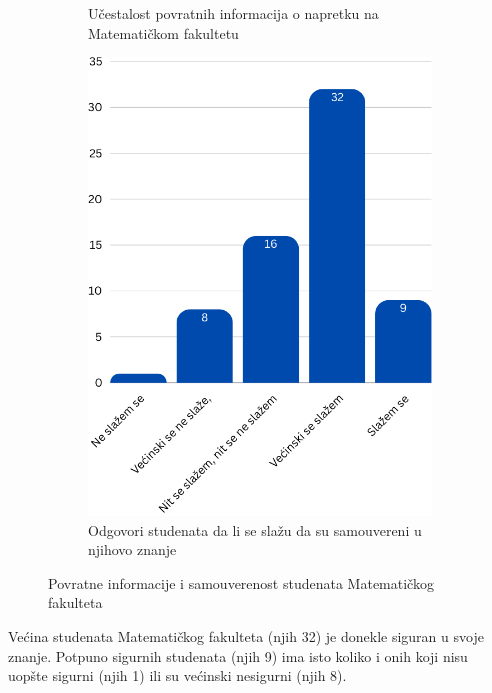 \documentclass[a4paper]{article}
\begin{document}
\begin{figure}[h!]
\begin{center}
{\begin{subfigure}[b]{0.45\textwidth}
            \vspace{50pt}
            \caption{Učestalost povratnih informacija o napretku na Matematičkom fakultetu}
            \label{fig:povratne_informacije_matf}
        \end{subfigure}
    }
    \hfill
    \begin{subfigure}[b]{0.45\textwidth}
        \includegraphics[width=\textwidth]{Slike/SamouverenostStudenataMatf.png}
        \caption{Odgovori studenata da li se slažu da su samouvereni u njihovo znanje}
        \label{fig:samouverenost_matf}
    \end{subfigure}
    \caption{Povratne informacije i samouverenost studenata Matematičkog fakulteta}
    \label{fig:combined_matf}
\end{center}
\end{figure}

Većina studenata Matematičkog fakulteta (njih 32) je donekle siguran u svoje znanje. Potpuno sigurnih studenata (njih 9) ima isto koliko i onih koji nisu uopšte sigurni (njih 1) ili su većinski nesigurni (njih 8).
\newpage
\end{document}
